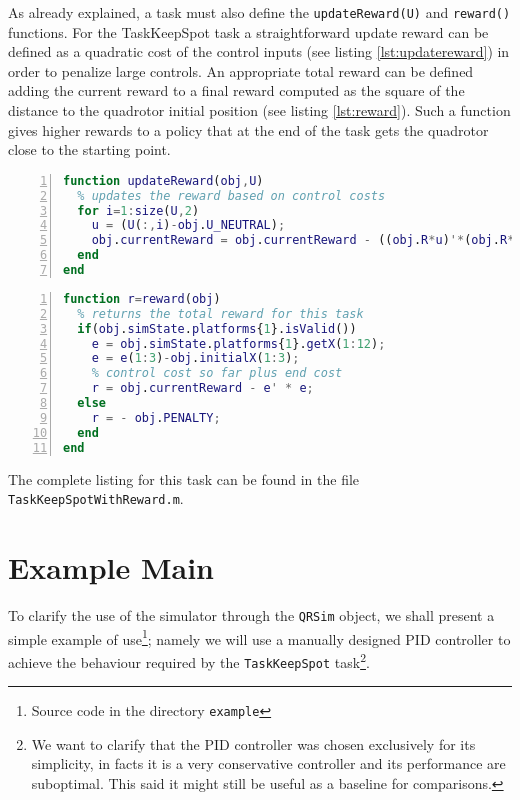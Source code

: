 \documentclass[a4paper,11pt]{report}
\newcommand{\snamettt}{\texttt{QRSim}\xspace}
\begin{document}
As already explained, a task must also define the \texttt{updateReward(U)} and \texttt{reward()} functions. For the TaskKeepSpot task a straightforward update reward can be defined as a quadratic cost of the control inputs (see listing \ref{lst:updatereward}) in order to penalize large controls. An appropriate total reward can be defined adding the current reward to a final reward computed as the square of the distance to the quadrotor initial position (see listing \ref{lst:reward}). Such a function gives higher rewards to a policy that at the end of the task gets the quadrotor close to the starting point.

\begin{lstlisting}[float=ht!bp,caption=TaskKeepSpotWithReward updateReward(U) method,language=Matlab,frame=lines,label=lst:updatereward,numbers=left,basicstyle=\small]
function updateReward(obj,U)         
  % updates the reward based on control costs
  for i=1:size(U,2)
    u = (U(:,i)-obj.U_NEUTRAL);
    obj.currentReward = obj.currentReward - ((obj.R*u)'*(obj.R*u))*obj.dt;
  end
end
\end{lstlisting}    
\begin{lstlisting}[float=ht!bp,caption=TaskKeepSpot reward() method,language=Matlab,frame=lines,label=lst:reward,numbers=left,basicstyle=\small]   
function r=reward(obj) 
  % returns the total reward for this task      
  if(obj.simState.platforms{1}.isValid())
    e = obj.simState.platforms{1}.getX(1:12);
    e = e(1:3)-obj.initialX(1:3);
    % control cost so far plus end cost
    r = obj.currentReward - e' * e; 
  else
    r = - obj.PENALTY;
  end                
end
\end{lstlisting}

The complete listing for this task can be found in the file \texttt{TaskKeepSpotWithReward.m}.  

\section{Example Main}
To clarify the use of the simulator through the \snamettt object, we shall present a simple example of use\footnote{Source code in the directory \texttt{example}}; namely we will use a manually designed PID controller to achieve the behaviour required by the \texttt{TaskKeepSpot} task\footnote{We want to clarify that the PID controller was chosen exclusively for its simplicity, in facts it is a very conservative controller and its performance are suboptimal. This said it might still be useful as a baseline for comparisons.}.
\end{document}

